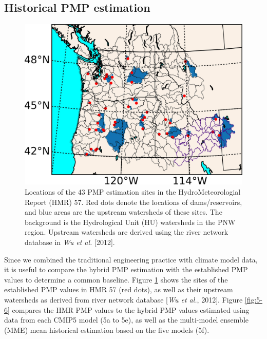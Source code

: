 \subsection{Historical PMP estimation}

\begin{figure}[htbp]
	\includegraphics[width=\linewidth]{pics/ch5/fig5.jpg}
	\caption{Locations of the 43 PMP estimation sites in the HydroMeteorologial Report (HMR) 57. Red dots denote the locations of dams/reservoirs, and blue areas are the upstream watersheds of these sites. The background is the Hydrological Unit (HU) watersheds in the PNW region. Upstream watersheds are derived using the river network database in \textit{Wu et al.} [2012].}
	\label{fig:5-5}
\end{figure}

Since we combined the traditional engineering practice with climate model data, it is useful to compare the hybrid PMP estimation with the established PMP values to determine a common baseline. Figure \ref{fig:5-5} shows the sites of the established PMP values in HMR 57 (red dots), as well as their upstream watersheds as derived from river network database [\textit{Wu et al.}, 2012]. Figure \ref{fig:5-6} compares the HMR PMP values to the hybrid PMP values estimated using data from each CMIP5 model (5a to 5e), as well as the multi-model ensemble (MME) mean historical estimation based on the five models (5f).

